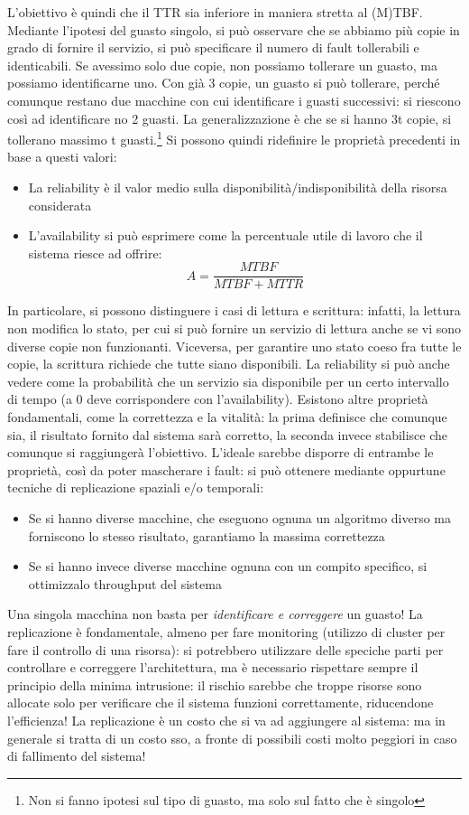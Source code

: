 L'obiettivo è quindi che il TTR sia inferiore in maniera stretta al (M)TBF.
Mediante l'ipotesi del guasto singolo, si può osservare che se abbiamo più copie in grado di fornire il servizio, si
può specificare il numero di fault tollerabili e identicabili. Se avessimo solo due copie, non possiamo tollerare un
guasto, ma possiamo identificarne uno. Con già 3 copie, un guasto si può tollerare,
perché comunque restano due macchine con cui identificare i guasti successivi:
si riescono così ad identificare no 2 guasti. La generalizzazione è che se si hanno 3t copie, si tollerano massimo t
guasti.\footnote{Non si fanno ipotesi sul tipo di guasto, ma solo sul fatto che è singolo} Si possono quindi
ridefinire le proprietà precedenti in base a questi valori:
\begin{itemize}
 \item La reliability è il valor medio sulla disponibilità/indisponibilità della risorsa considerata
 \item L'availability si può esprimere come la percentuale utile di lavoro che il sistema riesce ad offrire:
 \begin{equation}
  A = \frac{MTBF}{MTBF + MTTR}
 \end{equation}
\end{itemize}
In particolare, si possono distinguere i casi di lettura e scrittura: infatti, la lettura non modifica lo stato, per
cui si può fornire un servizio di lettura anche se vi sono diverse copie non funzionanti. Viceversa, per garantire uno
stato coeso fra tutte le copie, la scrittura richiede che tutte siano disponibili.
La reliability si può anche vedere come la probabilità che un servizio sia disponibile per un certo intervallo di 
tempo (a 0 deve corrispondere con l'availability).
Esistono altre proprietà fondamentali, come la correttezza e la vitalità: la prima definisce che comunque sia, il
risultato fornito dal sistema sarà corretto, la seconda invece stabilisce che comunque si raggiungerà l'obiettivo.
L'ideale sarebbe disporre di entrambe le proprietà, così da poter mascherare i fault: si può ottenere mediante 
oppurtune tecniche di replicazione spaziali e/o temporali:
\begin{itemize}
 \item Se si hanno diverse macchine, che eseguono ognuna un algoritmo diverso ma forniscono lo stesso risultato,
 garantiamo la massima correttezza
 \item Se si hanno invece diverse macchine ognuna con un compito specifico, si ottimizzalo throughput del sistema
\end{itemize}
Una singola macchina non basta per \textit{identificare e correggere} un guasto! La replicazione è fondamentale,
almeno per fare monitoring (utilizzo di cluster per fare il controllo di una risorsa): si potrebbero utilizzare delle
speciche parti per controllare e correggere l'architettura, ma è necessario rispettare sempre il principio della minima
intrusione: il rischio sarebbe che troppe risorse sono allocate solo per verificare che il sistema funzioni correttamente,
riducendone l'efficienza! La replicazione è un costo che si va ad aggiungere al sistema: ma in generale si tratta di un
costo sso, a fronte di possibili costi molto peggiori in caso di fallimento del sistema!
